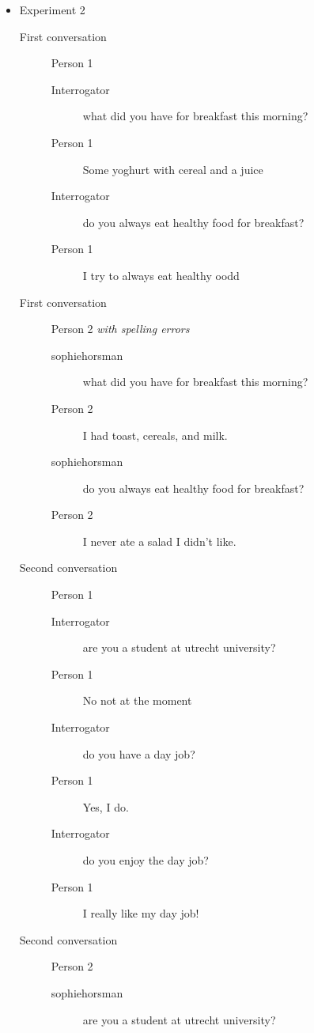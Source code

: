 \begin{itemize}
   \item Experiment 2
      \begin{description}
         \item [First conversation] Person 1
            \begin{description}
               \item [Interrogator] what did you have for breakfast this morning?
               \item [Person 1] Some yoghurt with cereal and a juice
               \item [Interrogator] do you always eat healthy food for breakfast?
               \item [Person 1] I try to always eat healthy oodd
            \end{description}
         \item [First conversation] Person 2 \textit{with spelling errors}
            \begin{description}
               \item [sophiehorsman] what did you have for breakfast this morning?
               \item [Person 2] I had toast, cereals, and milk.
               \item [sophiehorsman] do you always eat healthy food for breakfast?
               \item [Person 2] I never ate a salad I didn't like.
            \end{description}
         \item [Second conversation] Person 1
            \begin{description}
               \item [Interrogator] are you a student at utrecht university?
               \item [Person 1] No not at the moment
               \item [Interrogator] do you have a day job?
               \item [Person 1] Yes, I do.
               \item [Interrogator] do you enjoy the day job?
               \item [Person 1] I really like my day job!
            \end{description}
         \item [Second conversation] Person 2
            \begin{description}
               \item [sophiehorsman] are you a student at utrecht university?

\end{description}
\end{description}
\end{itemize}
